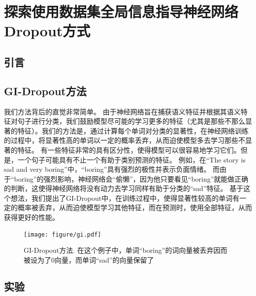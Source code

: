 
\chapter{探索使用数据集全局信息指导神经网络Dropout方式}

\section{引言}

\section{GI-Dropout方法}
我们方法背后的直觉非常简单。
由于神经网络旨在捕获语义特征并根据其语义特征对句子进行分类，我们鼓励模型尽可能的学习更多的特征（尤其是那些不那么显著的特征）。我们的方法是，通过计算每个单词对分类的显著性，在神经网络训练的过程中，将显著性高的单词以一定的概率丢弃，从而迫使模型多去学习那些不显著的特征。
有一些特征非常的具有区分性，使得模型可以很容易地学习它们。但是，一个句子可能具有不止一个有助于类别预测的特征。
例如，在``The story is sad and very boring''中，``boring''具有强烈的极性并表示负面情绪。
而由于``boring''的强烈影响，神经网络会``偷懒''，因为他只要看见``boring''就能做正确的判断，这使得神经网络将没有动力去学习同样有助于分类的``sad''特征。
基于这个想法，我们提出了GI-Dropout中，在训练过程中，使得显著性较高的单词有一定的概率被丢弃，从而迫使模型学习其他特征，而在预测时，使用全部特征，从而获得更好的性能。
\begin{figure}[!t]
\centering
  \texttt{[image: figure/gi.pdf]}
  \caption{GI-Dropout方法. 在这个例子中，单词``boring''的词向量被丢弃因而被设为了0向量，而单词``sad''的向量保留了}
  \label{fig:model}
\end{figure}



\section{实验}
